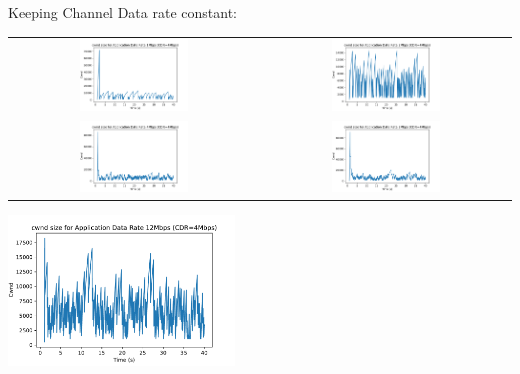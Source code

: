 \documentclass[12pt]{article}
\begin{document}
\clearpage

Keeping Channel Data rate constant:

\begin{center}
    \begin{tabular}{c c}
        \includegraphics[width=0.45\textwidth]{../Q2/const_cdr_1Mbps.pdf} & 
        \includegraphics[width=0.45\textwidth]{../Q2/const_cdr_2Mbps.pdf} \\
        \includegraphics[width=0.45\textwidth]{../Q2/const_cdr_4Mbps.pdf} &
        \includegraphics[width=0.45\textwidth]{../Q2/const_cdr_8Mbps.pdf} \\
    \end{tabular}
        \includegraphics[width=0.45\textwidth]{../Q2/const_cdr_12Mbps.pdf} 
\end{center}
\end{document}
